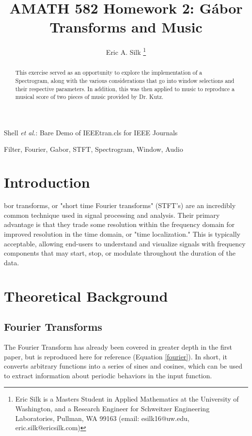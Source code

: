 \documentclass[journal]{IEEEtran}
\begin{document}
\title{AMATH 582 Homework 2: G\'{a}bor Transforms and Music}

\author{Eric A. Silk
\thanks{Eric Silk is a Masters Student in Applied Mathematics at the University of Washington,
		and a Research Engineer for Schweitzer Engineering Laboratories, Pullman, WA 99163 (email: esilk16@uw.edu, eric.silk@ericsilk.com)}
}

{Shell \MakeLowercase{\textit{et al.}}: Bare Demo of IEEEtran.cls for IEEE Journals}
\maketitle

\begin{abstract}
This exercise served as an opportunity to explore the implementation of a Spectrogram, along with the various considerations that go into window selections and their respective parameters.
In addition, this was then applied to music to reproduce a musical score of two pieces of music provided by Dr. Kutz.
\end{abstract}

\begin{IEEEkeywords}
Filter, Fourier, Gabor, STFT, Spectrogram, Window, Audio
\end{IEEEkeywords}


\IEEEpeerreviewmaketitle


\section{Introduction}

bor transforms, or "short time Fourier transforms" (STFT's) are an incredibly common technique used in signal processing and analysis. Their primary advantage is that they trade some resolution
within the frequency domain for improved resolution in the time domain, or "time localization." This is typically acceptable, allowing end-users to understand and visualize signals with frequency components that may
start, stop, or modulate throughout the duration of the data.

\section{Theoretical Background}


\subsection{Fourier Transforms}
The Fourier Transform has already been covered in greater depth in the first paper, but is reproduced here for reference (Equation \ref{fourier}). In short, it converts arbitrary functions into a series of
sines and cosines, which can be used to extract information about periodic behaviors in the input function.
\end{document}
